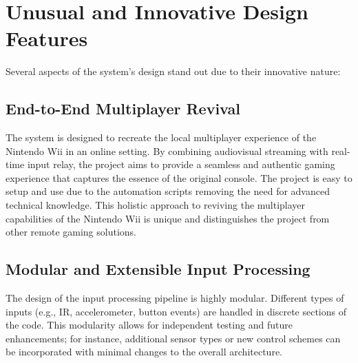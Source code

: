 \section{Unusual and Innovative Design Features}

Several aspects of the system’s design stand out due to their innovative nature:

\subsection*{End-to-End Multiplayer Revival}

The system is designed to recreate the local multiplayer experience of the Nintendo Wii in an online setting. By combining audiovisual streaming with real-time input relay, the project aims to provide a seamless and authentic gaming experience that captures the essence of the original console. The project is easy to setup and use due to the automation scripts removing the need for advanced technical knowledge. This holistic approach to reviving the multiplayer capabilities of the Nintendo Wii is unique and distinguishes the project from other remote gaming solutions.




\subsection*{Modular and Extensible Input Processing}

The design of the input processing pipeline is highly modular. Different types of inputs (e.g., IR, accelerometer, button events) are handled in discrete sections of the code. This modularity allows for independent testing and future enhancements; for instance, additional sensor types or new control schemes can be incorporated with minimal changes to the overall architecture.

